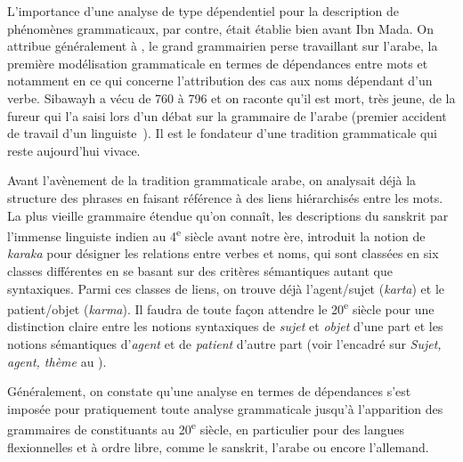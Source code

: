 {    L’importance d’une analyse de type dépendentiel pour la description de phénomènes grammaticaux, par contre, était établie bien avant Ibn Mada. On attribue généralement à , le grand grammairien perse travaillant sur l’arabe, la première modélisation grammaticale en termes de dépendances entre mots et notamment en ce qui concerne l’attribution des cas aux noms dépendant d’un verbe. Sibawayh a vécu de 760 à 796 et on raconte qu’il est mort, très jeune, de la fureur qui l’a saisi lors d’un débat sur la grammaire de l’arabe (premier accident de travail d’un linguiste~{\CryingSmiley}). Il est le fondateur d’une tradition grammaticale qui reste aujourd’hui vivace.

    Avant l’avènement de la tradition grammaticale arabe, on analysait déjà la structure des phrases en faisant référence à des liens hiérarchisés entre les mots. La plus vieille grammaire étendue qu’on connaît, les descriptions du sanskrit par l’immense linguiste indien  au 4\textsuperscript{e} siècle avant notre ère, introduit la notion de \textit{karaka} pour désigner les relations entre verbes et noms, qui sont classées en six classes différentes en se basant sur des critères sémantiques autant que syntaxiques. Parmi ces classes de liens, on trouve déjà l’agent/sujet (\textit{karta}) et le patient/objet (\textit{karma}). Il faudra de toute façon attendre le 20\textsuperscript{e} siècle pour une distinction claire entre les notions syntaxiques de \textit{sujet} et \textit{objet} d’une part et les notions sémantiques d’\textit{agent} et de \textit{patient} d’autre part (voir l’encadré sur \textit{Sujet, agent, thème} au ).

    Généralement, on constate qu’une analyse en termes de dépendances s’est imposée pour pratiquement toute analyse grammaticale jusqu’à l’apparition des grammaires de constituants au 20\textsuperscript{e} siècle, en particulier pour des langues flexionnelles et à ordre libre, comme le sanskrit, l’arabe ou encore l’allemand.

}
